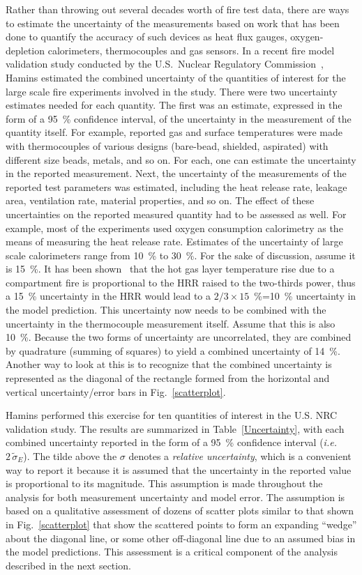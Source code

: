 Rather than throwing out several decades worth of fire test data, there are ways to estimate the uncertainty of the measurements based on work
that has been done to quantify the accuracy of such devices as heat flux gauges, oxygen-depletion calorimeters, thermocouples and gas sensors.
In a recent fire model validation study conducted by the U.S.~Nuclear Regulatory Commission~\cite{NUREG_1824}, Hamins estimated the combined
uncertainty of the quantities of interest for the large scale fire experiments involved in the study. There were
two uncertainty estimates needed for each quantity. The first was an estimate, expressed in the form of a 95~\% confidence interval, of the
uncertainty in the measurement of the quantity itself. For example, reported gas and surface temperatures were made with thermocouples of various designs (bare-bead,
shielded, aspirated) with different size beads, metals, and so on. For each, one can estimate the uncertainty in the reported measurement. Next, the
uncertainty of the measurements of the reported test parameters was estimated, including the heat release rate, leakage area, ventilation rate, material
properties, and so on. The effect of these uncertainties on the reported measured quantity had to be assessed as well. For example, most of the
experiments used oxygen consumption calorimetry as the means of measuring the heat release rate.
Estimates of the uncertainty of large scale calorimeters range from 10~\% to 30~\%. For the sake of discussion, assume it is 15~\%.
It has been shown~\cite{SFPE:Walton} that the hot gas layer temperature rise due to
a compartment fire is proportional to the HRR raised to the two-thirds power, thus a 15~\% uncertainty in the HRR would lead to a $2/3 \times 15$~\%=10~\%
uncertainty in the model prediction. This uncertainty now needs to be combined with the uncertainty in the thermocouple measurement itself. Assume that
this is also 10~\%. Because the two forms of uncertainty are uncorrelated, they are combined by quadrature (summing of squares) to yield a combined
uncertainty of 14~\%. Another way to look at this is to recognize that the combined uncertainty is represented as the diagonal of the rectangle formed
from the horizontal and vertical uncertainty/error bars in Fig.~\ref{scatterplot}.

Hamins performed this exercise for ten quantities of interest in the U.S. NRC validation study. The results are summarized in Table~\ref{Uncertainty}, with
each combined uncertainty reported in the form of a 95~\% confidence interval ({\em i.e.} $2 \, \widetilde{\sigma}_E$). The tilde above the $\sigma$ denotes a
{\em relative uncertainty}, which is a convenient way to report it because it is assumed that the uncertainty in the reported value is proportional to
its magnitude. This assumption is made throughout the analysis for both measurement uncertainty and model error. The assumption is based on a
qualitative assessment of dozens of scatter plots similar to that shown in Fig.~\ref{scatterplot} that show the scattered points to form an expanding ``wedge''
about the diagonal line, or some other off-diagonal line due to an assumed bias in the model predictions. This assessment is a critical component of the
analysis described in the next section.

